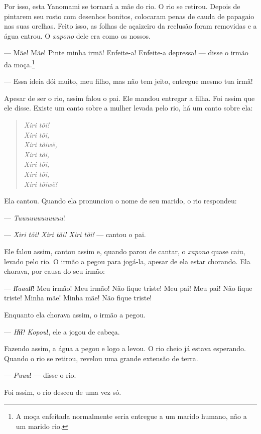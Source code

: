 Por isso, esta Yanomami se tornará a mãe do rio. O rio se retirou.
Depois de pintarem seu rosto com desenhos bonitos, colocaram penas de
cauda de papagaio nas suas orelhas. Feito isso, as folhas de açaizeiro
da reclusão foram removidas e a água entrou. O \textit{xapono} dele era como os
nossos. 

--- Mãe! Mãe! Pinte minha irmã! Enfeite-a! Enfeite-a depressa! --- disse
o irmão da moça.\footnote{A moça enfeitada normalmente seria entregue a um marido humano, não a um
marido rio.}

--- Essa ideia dói muito, meu filho, mas não tem jeito, entregue mesmo
tua irmã! 

Apesar de ser o rio, assim falou o pai. Ele mandou entregar a filha.
Foi assim que ele disse. Existe um canto sobre a mulher levada pelo rio,
há um canto sobre ela:

\begin{verse}
\textit{Xiri tõi!\\
Xiri tõi,\\
Xiri tõiwë,\\
Xiri tõi,\\
Xiri tõi,\\
Xiri tõi,\\
Xiri tõiwë!}
\end{verse}

Ela cantou. Quando ela pronunciou o nome de seu marido, o rio
respondeu: 

--- \textit{Tuuuuuuuuuuuu}!

--- \textit{Xiri tõi! Xiri tõi! Xiri tõi!} --- cantou o pai. 

Ele falou assim, cantou assim e, quando parou de cantar, o \textit{xapono} quase
 caiu, levado pelo rio. O irmão a pegou para jogá-la, apesar de ela estar
 chorando. Ela chorava, por causa do seu irmão: 

--- \textit{Ɨ̃ɨaaaɨ̃ɨ}! Meu irmão! Meu irmão! Não fique triste! Meu pai! Meu
 pai! Não fique triste! Minha mãe! Minha mãe! Não fique triste! 

Enquanto ela chorava assim, o irmão a pegou. 

--- \textit{Hɨ̃ɨ! Kopou}!, ele a jogou de cabeça. 

Fazendo assim, a água a pegou e logo a levou. O rio cheio já estava
esperando. Quando o rio se retirou, revelou uma grande extensão de
terra. 

--- \textit{Puuu}! --- disse o rio. 

Foi assim, o rio desceu de uma vez só. 

